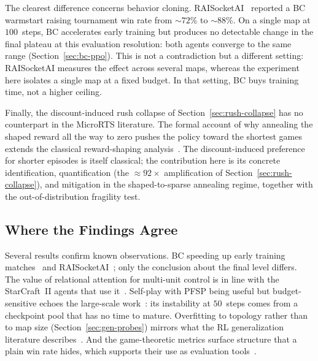 The clearest difference concerns behavior cloning. RAISocketAI~\cite{goodfriendCompetitionWinningDeep2024} reported a BC warmstart raising tournament win rate from ${\sim}72$\% to ${\sim}88$\%. On a single map at $100$\, steps, BC accelerates early training but produces no detectable change in the final plateau at this evaluation resolution: both agents converge to the same range (Section~\ref{sec:bc-ppo}). This is not a contradiction but a different setting: RAISocketAI measures the effect across several maps, whereas the experiment here isolates a single map at a fixed budget. In that setting, BC buys training time, not a higher ceiling.

Finally, the discount-induced rush collapse of Section~\ref{sec:rush-collapse} has no counterpart in the MicroRTS literature. The formal account of why annealing the shaped reward all the way to zero pushes the policy toward the shortest games extends the classical reward-shaping analysis~\cite{ngPolicyInvarianceReward1999}. The discount-induced preference for shorter episodes is itself classical; the contribution here is its concrete identification, quantification (the ${\approx}92\times$ amplification of Section~\ref{sec:rush-collapse}), and mitigation in the shaped-to-sparse annealing regime, together with the out-of-distribution fragility test.

\vspace*{-0.05cm}

\subsection{Where the Findings Agree}

Several results confirm known observations. BC speeding up early training matches~\cite{fosterBehaviorCloningAll2024} and RAISocketAI~\cite{goodfriendCompetitionWinningDeep2024}; only the conclusion about the final level differs. The value of relational attention for multi-unit control is in line with the StarCraft~II agents that use it~\cite{vinyalsGrandmasterLevelStarCraft2019, wangSCCEfficientDeep2020}. Self-play with PFSP being useful but budget-sensitive echoes the large-scale work~\cite{vinyalsGrandmasterLevelStarCraft2019, openaiDota2Large2019}: its instability at $50$\, steps comes from a checkpoint pool that has no time to mature. Overfitting to topology rather than to map size (Section~\ref{sec:gen-probes}) mirrors what the RL generalization literature describes~\cite{korkmazSurveyAnalyzingGeneralization2024, wittyMeasuringCharacterizingGeneralization2018}. And the game-theoretic metrics surface structure that a plain win rate hides, which supports their use as evaluation tools~\cite{balduzziReevaluatingEvaluation2018, omidshafieiARankMultiAgentEvaluation2019}.

